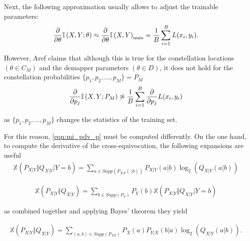 Next, the following approximation usually allows to adjust the trainable parameters:
\begin{align}
	\pdv{\theta} \mathbb{I} \left(X , Y ; \theta \right) \approx \pdv{\theta} \mathbb{I} \left(X , Y\right)_{\text{num}} = \dfrac{1}{B} \sum \limits_{i = 1}^{B} L(x_i, y_i).
\end{align}

However, Aref claims that although this is true for the constellation locations $(\theta \in C_M)$ and the demapper parameters $(\theta \in D)$, it does not hold for the constellation probabilities $\{p_1, p_2, \dots, p_M\} = P_M$
\begin{align}
\label{eqn:mi_pdv_p}
	\pdv{p_j} \mathbb{I} \left(X , Y ; P_M \right) \not\approx \dfrac{1}{B} \sum \limits_{i = 1}^{B} \pdv{p_j} L(x_i, y_i)
\end{align}

as $\{p_1, p_2, \dots, p_M\}$ changes the statistics of the training set.

For this reason, \ref{eqn:mi_pdv_p} must be computed differently. On the one hand, to compute the derivative of the cross-equivocation, the following expansions are useful
\begin{align}
	\mathbb{X}\left(P_{X|Y} \Vert Q_{X|Y} \vert Y=b \right) = \sum \limits_{a \in Supp(P_{X|Y}(\cdot|b))} P_{X|Y}(a|b) \log_2(Q_{X|Y}(a|b))
\end{align}

\begin{align}
	\mathbb{X}\left(P_{X|Y} \Vert Q_{X|Y}\right) = \sum \limits_{b \in Supp(P_Y)} P_Y(b) \mathbb{X}\left( P_{X|Y} \Vert Q_{X|Y} \vert Y=b \right) 
\end{align}

as combined together and applying Bayes' theorem they yield

\begin{align}
\label{eqn:CE_expanded}
	\mathbb{X}\left(P_{X|Y} \Vert Q_{X|Y}\right) = \sum \limits_{(a,b) \in Supp(P_{XY})} P_X(a) P_{Y|X}(b|a) \log_2(Q_{X|Y}(a|b)). 
\end{align}

